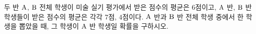 두 반 $\mathrm{A}$, $\mathrm{B}$ 전체 학생이 미술 실기 평가에서 받은 점수의 평균은 $6$점이고, $\mathrm{A}$ 반, $\mathrm{B}$ 반 학생들이 받은 점수의 평균은 각각 $7$점, $4$점이다. $\mathrm{A}$ 반과 $\mathrm{B}$ 반 전체 학생 중에서 한 학생을 뽑았을 때, 그 학생이 $\mathrm{A}$ 반 학생일 확률을 구하시오.
